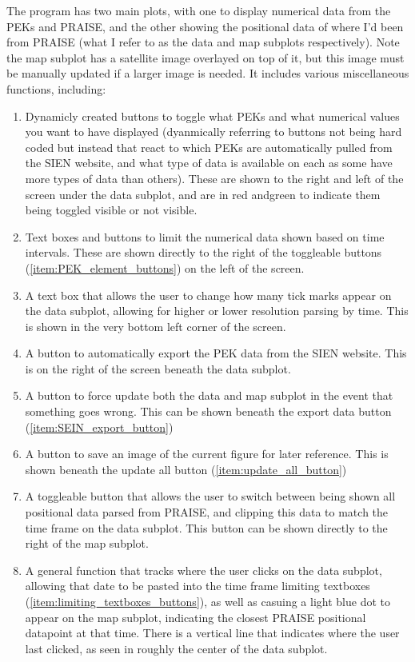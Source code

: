 \documentclass{article}
\begin{document}
\begin{multicols}{2}
The program has two main plots, with one to display numerical data from the PEKs and PRAISE,
and the other showing the positional data of where I'd been from PRAISE (what I refer to as 
the data and map subplots respectively). Note the map subplot has a satellite image overlayed
on top of it, but this image must be manually updated if a larger image is needed.
It includes various miscellaneous functions, including:
\begin{enumerate}
  \item \label{item:PEK_element_buttons} Dynamicly created buttons to toggle what PEKs and what numerical values you 
  want to have displayed (dyanmically referring to buttons not being hard coded but
  instead that react to which PEKs are automatically pulled from the SIEN website, 
  and what type of data is available on each as some have more types of data than
  others). These are shown to the right and left of the screen under the data
  subplot, and are in red andgreen to indicate them being toggled visible or not visible.
  \item \label{item:limiting_textboxes_buttons} Text boxes and buttons to limit the numerical data shown based on time intervals.
  These are shown directly to the right of the toggleable buttons (\ref{item:PEK_element_buttons})
  on the left of the screen.
  \item \label{item:xticks_textbox} A text box that allows the user to change how many tick marks appear on the data 
  subplot, allowing for higher or lower resolution parsing by time. This is shown in the very
  bottom left corner of the screen.
  \item \label{item:SEIN_export_button} A button to automatically export the PEK data from the 
  SIEN website. This is on the right of the screen beneath the data subplot.
  \item \label{item:update_all_button} A button to force update both the data and map
  subplot in the event that something goes wrong. This can be shown beneath the export data button
  (\ref{item:SEIN_export_button})
  \item \label{item:save_current_figure_button} A button to save an image of the current
  figure for later reference. This is shown beneath the update all button (\ref{item:update_all_button})
  \item \label{item:limit_graph_data_button} A toggleable button that allows the user to 
  switch between being shown all positional data parsed from PRAISE, and clipping this data
  to match the time frame on the data subplot. This button can be shown directly to the right 
  of the map subplot.
  \item \label{item:clicking_data_subplot_function} A general function that tracks where the 
  user clicks on the data subplot, allowing that date to be pasted into the time frame
  limiting textboxes (\ref{item:limiting_textboxes_buttons}), as well as casuing a light blue dot 
  to appear on the map subplot, indicating the closest PRAISE positional datapoint at that
  time. There is a vertical line that indicates where the user last clicked, as seen in 
  roughly the center of the data subplot.
\end{enumerate}


\end{multicols}
\end{document}
